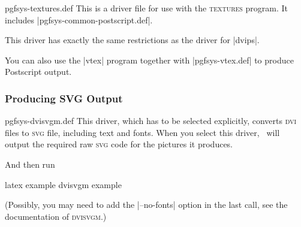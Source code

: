 \begin{filedescription}{pgfsys-textures.def}
  This is a driver file for use with the \textsc{textures} program. It
  includes |pgfsys-common-postscript.def|.

  This driver has exactly the same restrictions as the driver for
  |dvips|.
\end{filedescription}

You can also use the |vtex| program together with |pgfsys-vtex.def| to
produce Postscript output.



\subsubsection{Producing SVG Output}

\begin{filedescription}{pgfsys-dvisvgm.def}
  This driver, which has to be selected explicitly, converts
  \textsc{dvi} files to \textsc{svg} file, including text and
  fonts. When you select this driver, \pgfname\ will output the
  required raw \textsc{svg} code for the pictures it produces.

  And then run
\begin{codeexample}
latex example
dvisvgm example  
\end{codeexample}

  (Possibly, you may need to add the |--no-fonts| option in the last call,
  see the documentation of \textsc{dvisvgm}.)
\end{filedescription}


